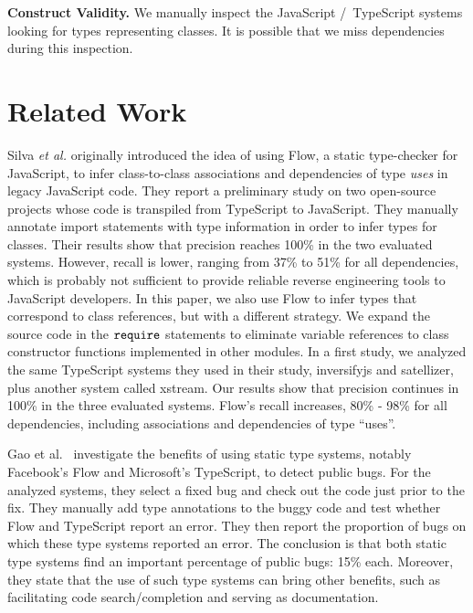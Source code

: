 \documentclass[review]{elsarticle}
\newcommand{\aspas}[1]{{``#1''}}
\newcommand{\mcode}[1]{$\tt #1$}
\begin{document}
\vspace{1.5 mm}

\noindent \textbf{Construct Validity.} We manually inspect the JavaScript /\ TypeScript systems looking for types representing classes. It is possible that we miss dependencies during this inspection. 



\section{Related Work}
\label{sec:related-work}

Silva \emph{et al.} \cite{sanerera2017} originally introduced the idea of using Flow, a static type-checker for JavaScript, to infer class-to-class associations and dependencies of type \textit{uses} in legacy JavaScript code. They report a preliminary study on two open-source projects whose code is transpiled from TypeScript to JavaScript. They manually annotate import statements with type information in order to infer types for classes. Their results show that precision reaches 100\% in the two evaluated systems. However, recall is lower, ranging from 37\% to 51\% for all dependencies, which is probably not sufficient to provide reliable reverse engineering tools to JavaScript developers. In this paper, we also use Flow to infer types that correspond to class references, but with a different strategy. We expand the source code in the \mcode{require} statements to eliminate variable references to class constructor functions implemented in other modules. In a first study, we analyzed the same TypeScript systems they used in their study, {\sc inversifyjs} and {\sc satellizer}, plus another system called {\sc xstream}. Our results show that precision continues in 100\% in the three evaluated systems. Flow's recall increases, 80\% - 98\% for all dependencies, including associations and dependencies of type \aspas{uses}.

Gao et al.~\cite{Gao2017} investigate the benefits of using static type systems, notably Facebook's Flow and Microsoft's TypeScript, to detect public bugs. For the analyzed systems, they select a fixed bug and check out the code just prior to the fix. They manually add type annotations to the buggy code and test whether Flow and TypeScript report an error. They then report the proportion of bugs on which these type systems reported an error. The conclusion is that both static type systems find an important percentage of public bugs: 15\% each. Moreover, they state that the use of such type systems can bring other benefits, such as facilitating code search/completion and serving as documentation.
\end{document}
